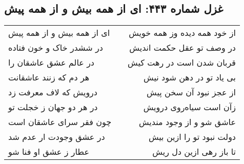 \begin{center}
\section*{غزل شماره ۴۴۳: ای از همه بیش و از همه پیش}
\label{sec:443}
\begin{longtable}{l p{0.5cm} r}
ای از همه بیش و از همه پیش
&&
از خود همه دیده وز همه خویش
\\
در ششدر خاک و خون فتاده
&&
در وصف تو عقل حکمت اندیش
\\
در عالم عشق عاشقان را
&&
قربان شدن است در رهت کیش
\\
هر دم که زنند عاشقانت
&&
بی یاد تو در دهن شود نیش
\\
درویش که لاف معرفت زد
&&
از عجز نبود آن سخن پیش
\\
در هر دو جهان ز خجلت تو
&&
زآن است سیاه‌روی درویش
\\
چون فقر سرای عاشقان است
&&
عاشق شو و از وجود مندیش
\\
در عشق وجودت ار عدم شد
&&
دولت نبود تو را ازین بیش
\\
عطار ز عشق او فنا شو
&&
تا باز رهی ازین دل ریش
\\
\end{longtable}
\end{center}
